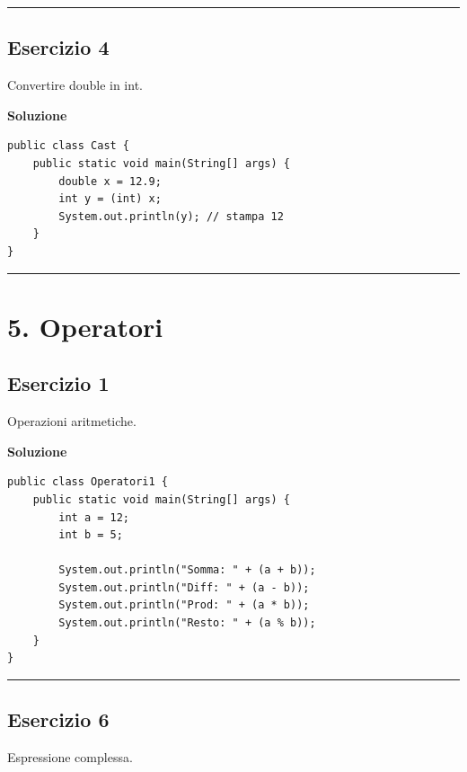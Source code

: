 \documentclass[
]{article}
\begin{document}
\begin{center}\rule{0.5\linewidth}{0.5pt}\end{center}

\subsection{Esercizio 4}\label{esercizio-4-3}

Convertire double in int.

\textbf{Soluzione}

\begin{verbatim}
public class Cast {
    public static void main(String[] args) {
        double x = 12.9;
        int y = (int) x;
        System.out.println(y); // stampa 12
    }
}
\end{verbatim}

\begin{center}\rule{0.5\linewidth}{0.5pt}\end{center}

\section{5. Operatori}\label{operatori}

\subsection{Esercizio 1}\label{esercizio-1-4}

Operazioni aritmetiche.

\textbf{Soluzione}

\begin{verbatim}
public class Operatori1 {
    public static void main(String[] args) {
        int a = 12;
        int b = 5;

        System.out.println("Somma: " + (a + b));
        System.out.println("Diff: " + (a - b));
        System.out.println("Prod: " + (a * b));
        System.out.println("Resto: " + (a % b));
    }
}
\end{verbatim}

\begin{center}\rule{0.5\linewidth}{0.5pt}\end{center}

\subsection{Esercizio 6}\label{esercizio-6}

Espressione complessa.
\end{document}
